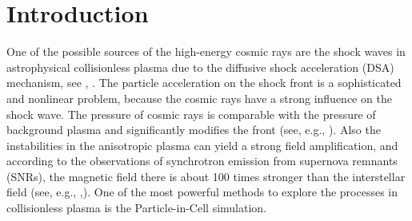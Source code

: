 \section{Introduction}
One of the possible sources of the high-energy cosmic rays are the shock waves in astrophysical collisionless plasma due to the diffusive shock acceleration (DSA) mechanism, see \cite{Bell1978}, \cite{Blandford1978}. The particle acceleration on the shock front is a sophisticated and nonlinear problem, because the cosmic rays have a strong influence on the shock wave. The pressure of cosmic rays is comparable with the pressure of background plasma and significantly modifies the front (see, e.g., \cite{Bykov2014}). 
Also the instabilities in the anisotropic plasma can yield a strong field amplification, and according to the observations of synchrotron emission from supernova remnants (SNRs), the magnetic field there is about 100 times stronger than the interstellar field (see, e.g., \cite{Berezhko2003},\cite{Uchiyama2007}). 
One of the most powerful methods to explore the processes in collisionless plasma is the Particle-in-Cell simulation.